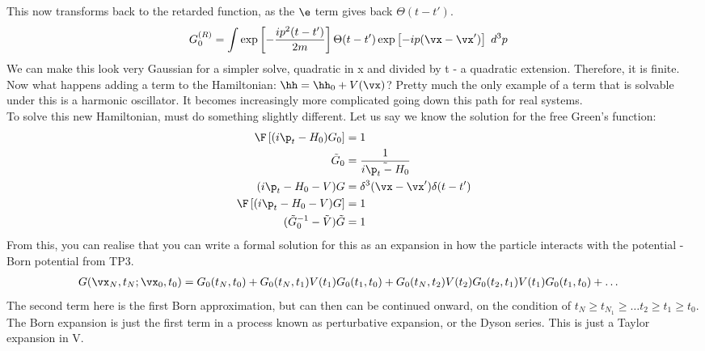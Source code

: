 \documentclass[a4paper, 11pt, normalem]{report}
\begin{document}
This now transforms back to the retarded function, as the $\e$ term gives back $\Theta(t-t')$.
\begin{align}
    G^{(R)}_0 &= \int \exp\left[-\frac{ip^2(t-t')}{2m}\right] \Theta(t-t')\exp\left[-ip(\vx-\vx')\right]\; d^3p
\end{align}
We can make this look very Gaussian for a simpler solve, quadratic in x and divided by t - a quadratic extension.
Therefore, it is finite. \\
Now what happens adding a term to the Hamiltonian: $\hh = \hh_0 + V(\vx)$?
Pretty much the only example of a term that is solvable under this is a harmonic oscillator. 
It becomes increasingly more complicated going down this path for real systems.\\
To solve this new Hamiltonian, must do something slightly different. 
Let us say we know the solution for the free Green's function:
\begin{align}
    \F\left[(i\p_t - H_0)G_0\right] &= 1 \\
    \tilde{G}_0 &= \frac{1}{\tilde{i\p_t - H_0}} \\
    (i\p_t - H_0 - V)G &= \delta^3(\vx-\vx')\delta(t-t') \\
    \F\left[(i\p_t-H_0-V)G\right] &= 1 \\
    (\tilde{G}_0^{-1} - \tilde{V})\tilde{G} &= 1
\end{align}
From this, you can realise that you can write a formal solution for this as an expansion in how the particle interacts with the potential - Born potential from TP3. 
\begin{align}
    G(\vx_N,t_N;\vx_0,t_0) &= G_0(t_N,t_0) + G_0(t_N,t_1)V(t_1)G_0(t_1,t_0) + G_0(t_N,t_2)V(t_2)G_0(t_2,t_1)V(t_1)G_0(t_1,t_0) + \dots
\end{align}
The second term here is the first Born approximation, but can then can be continued onward, on the condition of $t_N \geq t_{N_1} \geq \dots t_2\geq t_1\geq t_0$.
The Born expansion is just the first term in a process known as perturbative expansion, or the Dyson series. 
This is just a Taylor expansion in V.

\chapter{}
\end{document}
